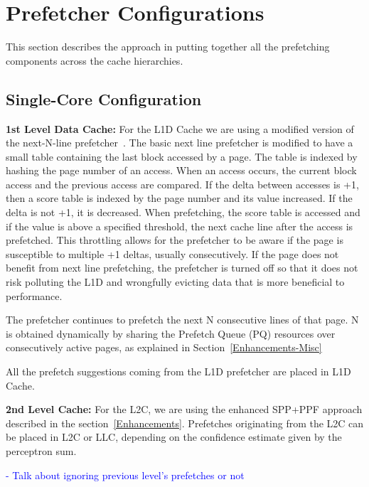 \section{Prefetcher Configurations}
\label{Config}

This section describes the approach in putting together all the prefetching 
components across the cache hierarchies. 

\subsection{Single-Core Configuration}
\label{Config-Single}

\noindent \textbf{1st Level Data Cache:}
For the L1D Cache we are using a modified version of the next-N-line
prefetcher~\cite{nextn}.  The basic next line prefetcher is modified to have a
small table containing the last block accessed by a page. The table is indexed
by hashing the page number of an access.  When an access occurs, the current
block access and the previous access are compared.  If the delta between
accesses is +1, then a score table is indexed by the page number and its value
increased. If the delta is not +1, it is decreased. When prefetching, the
score table is accessed and if the value is above a specified threshold, the
next cache line after the access is prefetched. This throttling allows for the
prefetcher to be aware if the page is susceptible to multiple +1 deltas,
usually consecutively. If the page does not benefit from next line
prefetching, the prefetcher is turned off so that it does not risk polluting
the L1D and wrongfully evicting data that is more beneficial to performance.

The prefetcher continues to prefetch the next N consecutive lines of that page. N is 
obtained dynamically by sharing the Prefetch Queue (PQ) resources over consecutively
active pages, as explained in Section~\ref{Enhancements-Misc}

All the prefetch suggestions coming from the L1D prefetcher are placed in L1D Cache.

\noindent \textbf{2nd Level Cache:}
For the L2C, we are using the enhanced SPP+PPF approach described in the
section~\ref{Enhancements}. Prefetches originating from the L2C can be placed
in L2C or LLC, depending on the confidence estimate given by the perceptron
sum.

\textcolor{blue}{
- Talk about ignoring previous level's prefetches or not
}

